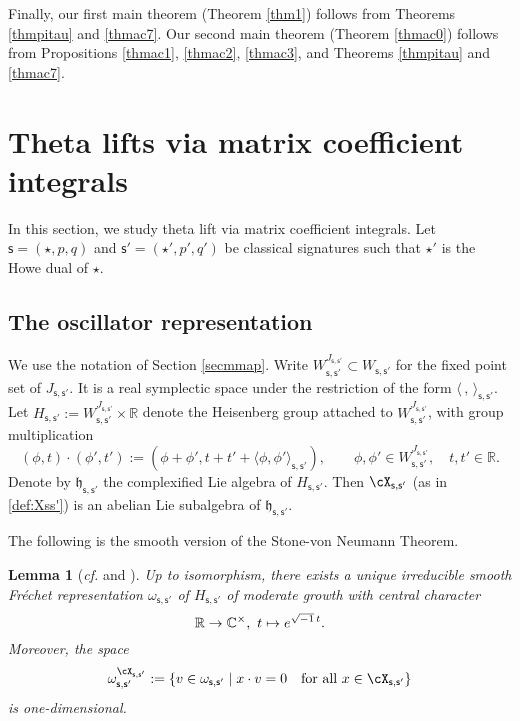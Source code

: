 \documentclass[12pt,a4paper]{amsart}
\newcommand{\h}{\mathfrak h}
\newcommand{\R}{\mathbb R}
\newcommand{\la}{\langle}
\newcommand{\ra}{\rangle}
\numberwithin{equation}{section}
\newtheorem{lem}[thm]{Lemma}
\theoremstyle{remark}
\def\cf{\emph{cf.} }
\begin{document}
Finally, our first main theorem (Theorem \ref{thm1}) follows from Theorems \ref{thmpitau} and \ref{thmac7}. Our second main theorem (Theorem \ref{thmac0}) follows from Propositions \ref{thmac1},  \ref{thmac2}, \ref{thmac3}, and Theorems \ref{thmpitau} and \ref{thmac7}.


\section{Theta lifts via matrix coefficient integrals}\label{sec:Integrals}%

In this section,
we study theta lift via
matrix coefficient integrals. Let $\mathsf s=(\star, p,q)$ and $ \mathsf s'=(\star', p',q')$ be classical signatures such that $\star'$ is the Howe dual of $\star$.



\subsection{The oscillator representation}\label{secoscil}
We use the notation of Section \ref{secmmap}. Write
$
  W_{\mathsf s, \mathsf s'}^{J_{\mathsf s, \mathsf s'}}\subset W_{\mathsf s, \mathsf s'}
$
for the fixed point set of $J_{\mathsf s, \mathsf s'}$. It is a real symplectic space under the restriction of the form $\la\,,\,\ra_{\mathsf s, \mathsf s'}$. Let $H_{\mathsf s, \mathsf s'}:= W_{\mathsf s, \mathsf s'}^{J_{\mathsf s, \mathsf s'}}\times \R$
denote the Heisenberg group attached to $W_{\mathsf s, \mathsf s'}^{J_{\mathsf s, \mathsf s'}}$, with group multiplication
\[
  (\phi ,t)\cdot (\phi ', t'):=(\phi +\phi ', t+t'+\la \phi , \phi '\ra_{\mathsf s, \mathsf s'}), \qquad \phi ,\phi '\in  W_{\mathsf s, \mathsf s'}^{J_{\mathsf s, \mathsf s'}}, \quad t, t'\in \R.
\]
Denote by $\h_{\mathsf s, \mathsf s'}$ the complexified Lie algebra of $H_{\mathsf s, \mathsf s'}$. Then  $\cX_{\mathsf s, \mathsf s'}$ (as in \eqref{def:Xss'}) is  an abelian Lie subalgebra of $\h_{\mathsf s, \mathsf s'}$.

The following is the smooth version of the Stone-von Neumann Theorem.

\begin{lem}[{\cf \cite[Theorem 5.1]{Cl89} and \cite[Section 4]{Ad07}}]\label{vn}
Up to isomorphism, there exists a unique irreducible smooth Fr\'echet representation $\omega_{\mathsf s, \mathsf s'}$ of $H_{\mathsf s, \mathsf s'}$ of moderate growth with central character
\[
\R\rightarrow \C^\times, \ t\mapsto e^{\sqrt{-1}\, t}.
\]
Moreover, the space
\[
  \omega_{\mathsf s, \mathsf s'}^{\cX_{\mathsf s, \mathsf s'}}:=\{v\in \omega_{\mathsf s, \mathsf s'}\mid x \cdot v=0\quad \textrm{for all $x\in \cX_{\mathsf s, \mathsf s'}$}\}
\]
is one-dimensional.
\end{lem}
\end{document}
